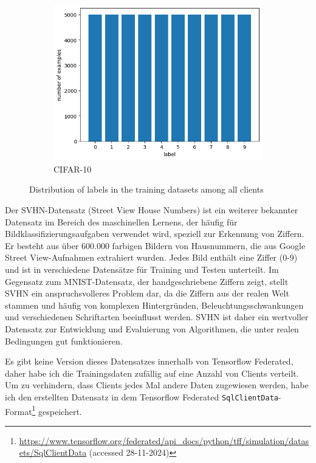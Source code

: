 \begin{figure}[tb]
\begin{subfigure}{0.3\textwidth}
		\includegraphics[width=\textwidth]{Bilder/cifar_label_distribution.png}
		\caption{CIFAR-10}
	\end{subfigure}
	\caption{Distribution of labels in the training datasets among all clients}
	\label{fig:label-distribution-all}
\end{figure}

Der SVHN-Datensatz (Street View House Numbers) ist ein weiterer bekannter Datensatz im Bereich des maschinellen Lernens, der häufig für Bildklassifizierungsaufgaben verwendet wird, speziell zur Erkennung von Ziffern. Er besteht aus über 600.000 farbigen Bildern von Hausnummern, die aus Google Street View-Aufnahmen extrahiert wurden. Jedes Bild enthält eine Ziffer (0-9) und ist in verschiedene Datensätze für Training und Testen unterteilt. Im Gegensatz zum MNIST-Datensatz, der handgeschriebene Ziffern zeigt, stellt SVHN ein anspruchsvolleres Problem dar, da die Ziffern aus der realen Welt stammen und häufig von komplexen Hintergründen, Beleuchtungsschwankungen und verschiedenen Schriftarten beeinflusst werden. SVHN ist daher ein wertvoller Datensatz zur Entwicklung und Evaluierung von Algorithmen, die unter realen Bedingungen gut funktionieren.

Es gibt keine Version dieses Datensatzes innerhalb von Tensorflow Federated, daher habe ich die Trainingsdaten zufällig auf eine Anzahl von Clients verteilt. Um zu verhindern, dass Clients jedes Mal andere Daten zugewiesen werden, habe ich den erstellten Datensatz in dem Tensorflow Federated \texttt{SqlClientData}-Format\footnote{\url{https://www.tensorflow.org/federated/api_docs/python/tff/simulation/datasets/SqlClientData} (accessed 28-11-2024)} gespeichert.

